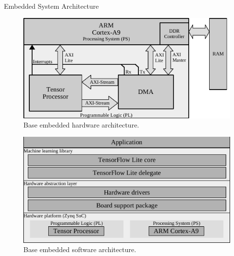 \documentclass[final]{beamer}
\newlength{\onecolwid}
\newlength{\twocolwid}
\begin{document}
\begin{frame}[t]
\begin{columns}[t]
\begin{column}{\twocolwid}
\begin{columns}[t,totalwidth=\twocolwid]
\begin{column}{\onecolwid}
\begin{block}{Embedded System Architecture}
	\begin{figure}
		\includegraphics[width=\linewidth]{../figures/system_design.pdf}
		\caption{Base embedded hardware architecture.}
		\label{fig:conv_sys_design}
	\end{figure}
	
	\begin{figure}
		\includegraphics[width=\linewidth]{../figures/sw_stack.pdf}
		\caption{Base embedded software architecture.}
		\label{fig:embedded_sw}
	\end{figure}
\end{block}


\end{column}
\end{columns}
\end{column}
\end{columns}
\end{frame}
\end{document}
